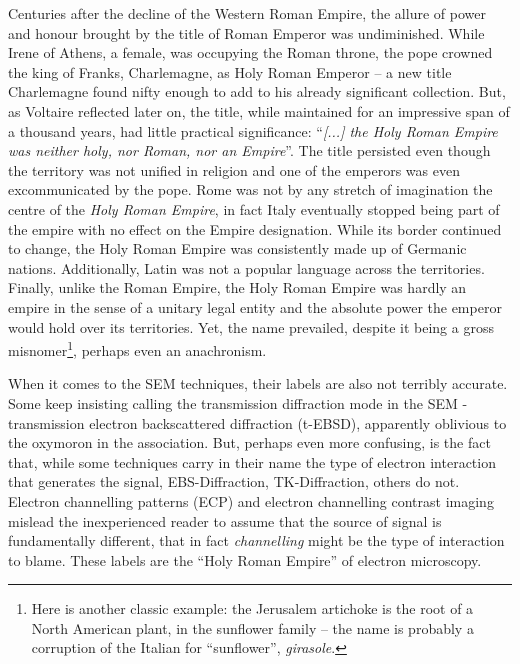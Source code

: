Centuries after the decline of the Western Roman Empire, the allure of power and honour brought by the title of Roman Emperor was undiminished. While Irene of Athens, a female, was occupying the Roman throne, the pope crowned the king of Franks, Charlemagne, as Holy Roman Emperor -- a new title Charlemagne found nifty enough to add to his already significant collection. But, as Voltaire reflected later on, the title, while maintained for an impressive span of a thousand years, had little practical significance: ``\textit{[...] the Holy Roman Empire was neither holy, nor Roman, nor an Empire}''. The title persisted even though the territory was not unified in religion and one of the emperors was even excommunicated by the pope. Rome was not by any stretch of imagination the centre of the \textit{Holy Roman Empire}, in fact Italy eventually stopped being part of the empire with no effect on the Empire designation. While its border continued to change, the Holy Roman Empire was consistently made up of Germanic nations. Additionally, Latin was not a popular language across the territories. Finally, unlike the Roman Empire, the Holy Roman Empire was hardly an empire in the sense of a unitary legal entity and the absolute power the emperor would hold over its territories. Yet, the name prevailed, despite it being a gross misnomer\footnote{Here is another classic example: the Jerusalem artichoke is the root of a North American plant, in the sunflower family -- the name is probably a corruption of the Italian for ``sunflower'', \textit{girasole}.}, perhaps even an anachronism. 

When it comes to the SEM techniques, their labels are also not terribly accurate. Some keep insisting calling the transmission diffraction  mode in the SEM - transmission electron backscattered diffraction (t-EBSD), apparently oblivious to the oxymoron in the  association. But, perhaps even more confusing, is the fact that, while some techniques carry in their name the type of electron interaction that generates the signal, EBS-Diffraction, TK-Diffraction, others do not. Electron channelling patterns (ECP) and electron channelling contrast imaging mislead the inexperienced reader to assume that the source of signal is fundamentally different, that in fact \textit{channelling} might be the type of interaction to blame. These labels are the ``Holy Roman Empire'' of electron microscopy. 

